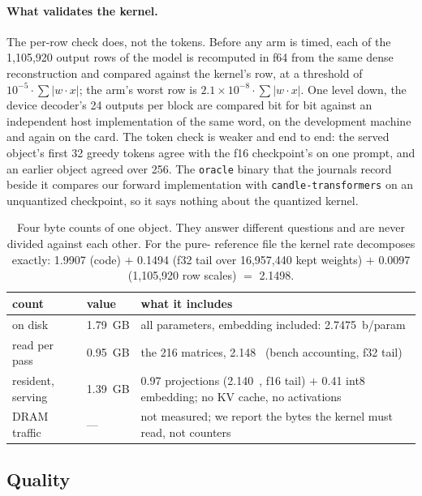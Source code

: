 \paragraph{What validates the kernel.} The per-row check does, not the tokens.
Before any arm is timed, each of the 1{,}105{,}920 output rows of the model is
recomputed in f64 from the same dense reconstruction and compared against the
kernel's row, at a threshold of $10^{-5}\cdot\sum|w\cdot x|$; the \Tetra{}
arm's worst row is $2.1\times10^{-8}\cdot\sum|w\cdot x|$. One level down, the
device decoder's 24 outputs per block are compared bit for bit against an
independent host implementation of the same word, on the development machine
and again on the card. The token check is weaker and end to end: the served
object's first 32 greedy tokens agree with the f16 checkpoint's on one prompt,
and an earlier \Tetra{} object agreed over 256. The \texttt{oracle} binary that
the journals record beside it compares our forward implementation with
\texttt{candle-transformers} on an unquantized checkpoint, so it says nothing
about the quantized kernel.

\begin{table}[t]
\centering\footnotesize\setlength{\tabcolsep}{4pt}
\begin{tabular}{llp{6.4cm}}
\toprule
count & value & what it includes\\
\midrule
on disk & 1.79~GB & all parameters, embedding included: 2.7475~b/param\\
read per pass & 0.95~GB & the 216 \Tetra{} matrices, 2.148~\bw{} (bench accounting, f32 tail)\\
resident, serving & 1.39~GB & 0.97 projections (2.140~\bw{}, f16 tail) $+$ 0.41 int8 embedding; no KV cache, no activations\\
DRAM traffic & --- & not measured; we report the bytes the kernel must read, not counters\\
\bottomrule
\end{tabular}
\caption{Four byte counts of one object. They answer different questions and
are never divided against each other. For the pure-\Tetra{} reference file the
kernel rate decomposes exactly: 1.9907 (code) $+$ 0.1494 (f32 tail over
16{,}957{,}440 kept weights) $+$ 0.0097 (1{,}105{,}920 row scales) $=$
2.1498.}
\label{tab:accounting}
\end{table}

\subsection{Quality}

